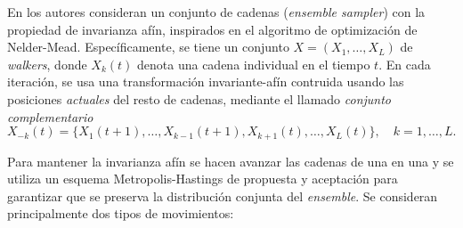 \documentclass[
  a4paper,
	fontsize=11pt, %
	twoside=false, %
  secnumdepth=2,
	numbers=noenddot, %
]{kaohandt}
\begin{document}
En  los autores consideran un conjunto de cadenas (\textit{ensemble sampler}) con la propiedad de invarianza afín, inspirados en el algoritmo de optimización de Nelder-Mead. Específicamente, se tiene un conjunto \(X=(X_1, \dots, X_L)\) de \textit{walkers}, donde \(X_k(t)\) denota una cadena individual en el tiempo \(t\). En cada iteración, se usa una transformación invariante-afín contruida usando las posiciones \textit{actuales} del resto de cadenas, mediante el llamado \textit{conjunto complementario}
\[
X_{-k}(t) = \{X_1(t+1), \dots, X_{k-1}(t+1), X_{k+1}(t), \dots, X_L(t)\}, \quad k=1,\dots, L.
\]

Para mantener la invarianza afín se hacen avanzar las cadenas de una en una y se utiliza un esquema Metropolis-Hastings de propuesta y aceptación para garantizar que se preserva la distribución conjunta del \textit{ensemble}. Se consideran principalmente dos tipos de movimientos:
\end{document}
